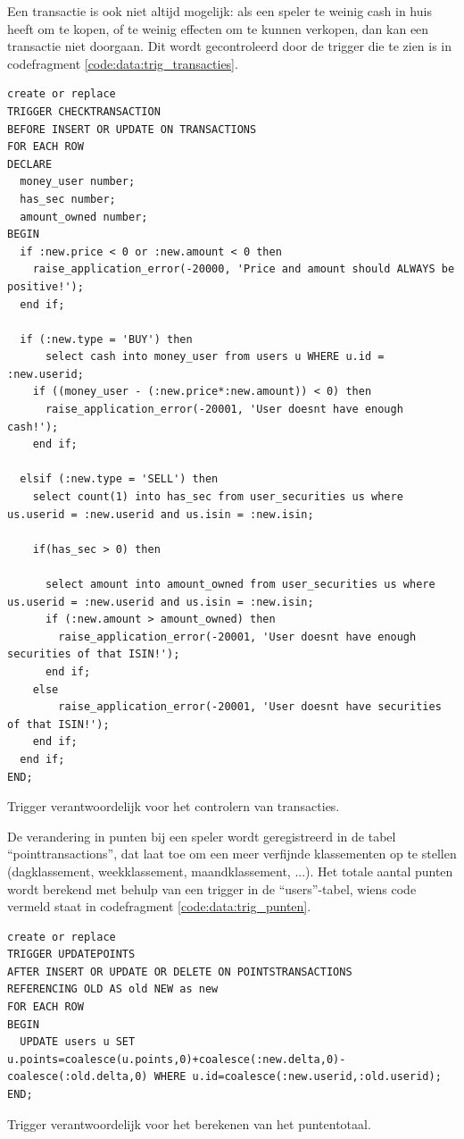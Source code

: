 Een transactie is ook niet altijd mogelijk: als een speler te weinig cash in huis heeft om te kopen, of te weinig effecten om te kunnen verkopen, dan kan een transactie niet doorgaan. Dit wordt gecontroleerd door de trigger die te zien is in codefragment \ref{code:data:trig_transacties}.

\begin{code}
\begin{lstlisting}
create or replace
TRIGGER CHECKTRANSACTION
BEFORE INSERT OR UPDATE ON TRANSACTIONS 
FOR EACH ROW 
DECLARE
  money_user number;
  has_sec number;
  amount_owned number;
BEGIN
  if :new.price < 0 or :new.amount < 0 then
    raise_application_error(-20000, 'Price and amount should ALWAYS be positive!');
  end if;
    
  if (:new.type = 'BUY') then
      select cash into money_user from users u WHERE u.id = :new.userid;
    if ((money_user - (:new.price*:new.amount)) < 0) then
      raise_application_error(-20001, 'User doesnt have enough cash!');
    end if;

  elsif (:new.type = 'SELL') then
    select count(1) into has_sec from user_securities us where us.userid = :new.userid and us.isin = :new.isin;
    
    if(has_sec > 0) then 
    
      select amount into amount_owned from user_securities us where us.userid = :new.userid and us.isin = :new.isin;
      if (:new.amount > amount_owned) then
        raise_application_error(-20001, 'User doesnt have enough securities of that ISIN!');
      end if;
    else
        raise_application_error(-20001, 'User doesnt have securities of that ISIN!');
    end if;
  end if;
END;
\end{lstlisting}
\caption{Trigger verantwoordelijk voor het controlern van transacties.}
\label{code:data:trig_transacties}
\end{code}


De verandering in punten bij een speler wordt geregistreerd in de tabel ``pointtransactions'', dat laat toe om een meer verfijnde klassementen op te stellen (dagklassement, weekklassement, maandklassement, ...). Het totale aantal punten wordt berekend met behulp van een trigger in de ``users''-tabel, wiens code vermeld staat in codefragment \ref{code:data:trig_punten}.

\begin{code}
\begin{lstlisting}
create or replace
TRIGGER UPDATEPOINTS
AFTER INSERT OR UPDATE OR DELETE ON POINTSTRANSACTIONS 
REFERENCING OLD AS old NEW as new
FOR EACH ROW 
BEGIN
  UPDATE users u SET u.points=coalesce(u.points,0)+coalesce(:new.delta,0)-coalesce(:old.delta,0) WHERE u.id=coalesce(:new.userid,:old.userid);
END;
\end{lstlisting}
\caption{Trigger verantwoordelijk voor het berekenen van het puntentotaal.}
\label{code:data:trig_punten}
\end{code}

